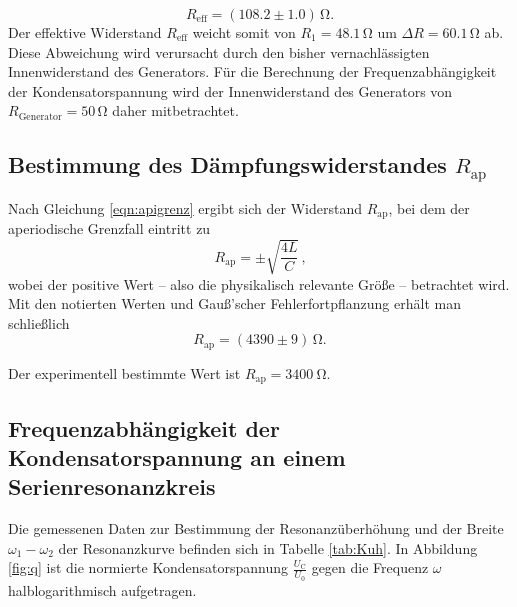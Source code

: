 \begin{equation*}
	R_{\text{eff}}= (108.2 \pm 1.0) \,\si{\ohm} \text{.}
\end{equation*}
Der effektive Widerstand $R_{\text{eff}}$ weicht somit von $R_1=48.1\,\si{\ohm}$ um $\Delta R=60.1\,\si{\ohm}$ ab. Diese Abweichung wird verursacht durch den bisher vernachlässigten Innenwiderstand des Generators.
Für die Berechnung der Frequenzabhängigkeit der Kondensatorspannung wird der Innenwiderstand des Generators von $R_{\mathrm{Generator}}=50\,\si{\ohm}$ daher mitbetrachtet.

\subsection{Bestimmung des Dämpfungswiderstandes $R_{\text{ap}}$}

Nach Gleichung \eqref{eqn:apigrenz} ergibt sich der Widerstand $R_{\text{ap}}$, bei dem der
aperiodische Grenzfall eintritt zu
\begin{equation}
	R_{\text{ap}} = \pm \sqrt{\frac{4L}{C}} \, \text{,}
	\label{eqn:rap}
\end{equation}
wobei der positive Wert -- also die physikalisch relevante Größe -- betrachtet wird.
Mit den notierten Werten und Gauß'scher Fehlerfortpflanzung erhält man schließlich
\begin{equation*}
	R_{\text{ap}} = (4390 \pm 9) \, \si{\ohm} \text{.}
\end{equation*}

Der experimentell bestimmte Wert ist $R_{\text{ap}} = \SI{3400}{\ohm}$.
\subsection{Frequenzabhängigkeit der Kondensatorspannung an einem Serienresonanzkreis}
Die gemessenen Daten zur Bestimmung der Resonanzüberhöhung und der Breite $ \omega_1 - \omega_2 $ der Resonanzkurve befinden sich in Tabelle \ref{tab:Kuh}.
In Abbildung \ref{fig:q} ist die normierte Kondensatorspannung $\frac{U_{\mathrm{C}}}{U_{\mathrm{0}}}$ gegen die Frequenz $\omega$ halblogarithmisch aufgetragen.

